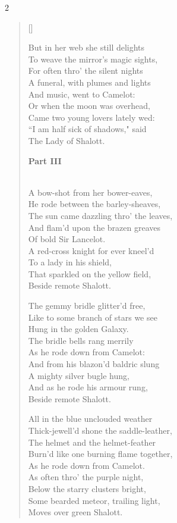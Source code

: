 \begin{paracol}{2}
\begin{verse}[\versewidth]
\begin{patverse}
But in her web she still delights\\
To weave the mirror's magic sights,\\
For often thro' the silent nights\\
A funeral, with plumes and lights\\
And music, went to Camelot:\\
Or when the moon was overhead,\\
Came two young lovers lately wed:\\
``I am half sick of shadows," said\\
The Lady of Shalott. \end{patverse}\switchcolumn

\textbf{Part III}
\begin{patverse}
\phantom{.}\\
A bow-shot from her bower-eaves,\\
He rode between the barley-sheaves,\\
The sun came dazzling thro' the leaves,\\
And flam'd upon the brazen greaves\\
Of bold Sir Lancelot.\\
A red-cross knight for ever kneel'd\\
To a lady in his shield,\\
That sparkled on the yellow field,\\
Beside remote Shalott.
\end{patverse}

\begin{patverse}
The gemmy bridle glitter'd free,\\
Like to some branch of stars we see\\
Hung in the golden Galaxy.\\
The bridle bells rang merrily\\
As he rode down from Camelot:\\
And from his blazon'd baldric slung\\
A mighty silver bugle hung,\\
And as he rode his armour rung,\\
Beside remote Shalott.
\end{patverse}

\begin{patverse}
All in the blue unclouded weather\\
Thick-jewell'd shone the saddle-leather,\\
The helmet and the helmet-feather\\
Burn'd like one burning flame together,\\
As he rode down from Camelot.\\
As often thro' the purple night,\\
Below the starry clusters bright,\\
Some bearded meteor, trailing light,\\
Moves over green Shalott.
\end{patverse}


\end{verse}
\end{paracol}
